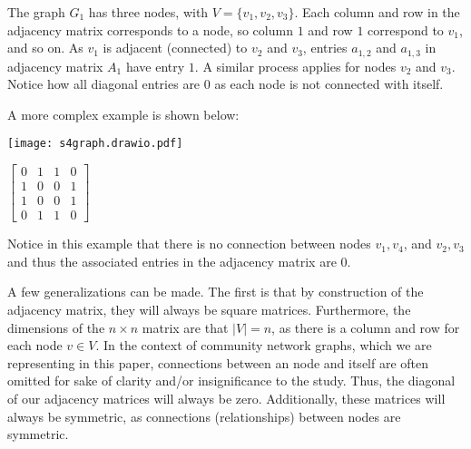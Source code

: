 \documentclass{article}
\begin{document}
\bigskip

The graph $G_1$ has three nodes, with $V = \{ v_1, v_2, v_3\}$.
Each column and row in the adjacency matrix corresponds to a node, so column $1$ and row $1$ correspond to $v_1$, and so on.
As $v_1$ is adjacent (connected) to $v_2$ and $v_3$, entries $a_{1,2}$ and $a_{1,3}$ in adjacency matrix $A_1$ have entry $1$. 
A similar process applies for nodes $v_2$ and $v_3$. 
Notice how all diagonal entries are $0$ as each node is not connected with itself.

\bigskip 
\noindent A more complex example is shown below:

\bigskip

\noindent\begin{minipage}{.5\textwidth}
\centering
\texttt{[image: s4graph.drawio.pdf]}
\label{fig:fig7}            
\end{minipage}%
\begin{minipage}{.5\textwidth}
\centering
\vspace{1cm}
 $\begin{bmatrix}
0 & 1 & 1 & 0\\
1 & 0 & 0 & 1\\
1 & 0 & 0 & 1\\
0 & 1 & 1 & 0
\end{bmatrix}$
\vspace{0.88cm}

\label{fig:fig8}            
\end{minipage}

\bigskip

\noindent Notice in this example that there is no connection between nodes $v_1, v_4$, and $v_2, v_3$ and thus the associated entries in the adjacency matrix are $0$.

\bigskip 
A few generalizations can be made. The first is that by construction of the adjacency matrix, they will always be square matrices.
Furthermore, the dimensions of the $n \times n$ matrix are that $|V| = n$, as there is a column and row for each node $v \in V$.
In the context of community network graphs, which we are representing in this paper, connections between an node and itself are often omitted for sake of clarity and/or insignificance to the study.
Thus, the diagonal of our adjacency matrices will always be zero. Additionally, these matrices will always be symmetric, as connections (relationships) between nodes are symmetric.
\end{document}
